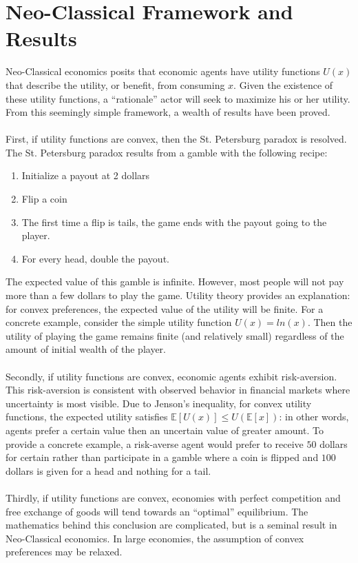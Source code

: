 \documentclass{article}
\theoremstyle{definition}
\begin{document}
\section{Neo-Classical Framework and Results}
Neo-Classical economics posits that economic agents have utility functions \(U(x)\) that describe the utility, or benefit, from consuming \(x\).  Given the existence of these utility functions, a ``rationale'' actor will seek to maximize his or her utility.  From this seemingly simple framework, a wealth of results have been proved.  
\\
\\
First, if utility functions are convex, then the St. Petersburg paradox is resolved.  The St. Petersburg paradox results from a gamble with the following recipe:
\begin{enumerate}
	\item Initialize a payout at 2 dollars
	\item Flip a coin
	\item The first time a flip is tails, the game ends with the payout going to the player.
	\item For every head, double the payout.
\end{enumerate}
The expected value of this gamble is infinite.  However, most people will not pay more than a few dollars to play the game.  Utility theory provides an explanation: for convex preferences, the expected value of the utility will be finite.  For a concrete example, consider the simple utility function \(U(x)=ln(x)\).  Then the utility of playing the game remains finite (and relatively small) regardless of the amount of initial wealth of the player.  
\\
\\
Secondly, if utility functions are convex, economic agents exhibit risk-aversion.  This risk-aversion is consistent with observed behavior in financial markets where uncertainty is most visible.  Due to Jenson's inequality, for convex utility functions, the expected utility satisfies \(\mathbb{E}\left[U(x)\right] \leq U(\mathbb{E}[x])\): in other words, agents prefer a certain value then an uncertain value of greater amount.  To provide a concrete example, a risk-averse agent would prefer to receive \(50\) dollars for certain rather than participate in a gamble where a coin is flipped and \(100\) dollars is given for a head and nothing for a tail.  
\\
\\
Thirdly, if utility functions are convex, economies with perfect competition and free exchange of goods will tend towards an ``optimal'' equilibrium.  The mathematics behind this conclusion are complicated, but is a seminal result in Neo-Classical economics.  In large economies, the assumption of convex preferences may be relaxed.  
\end{document}
